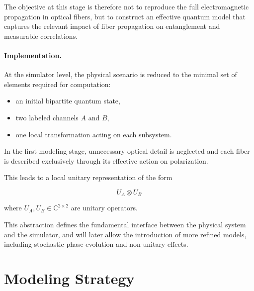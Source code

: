 \documentclass[a4paper]{article}
\begin{document}
The objective at this stage is therefore not to reproduce the full electromagnetic propagation in optical fibers, but to construct an effective quantum model that captures the relevant impact of fiber propagation on entanglement and measurable correlations.

\medskip

\paragraph{Implementation.}

At the simulator level, the physical scenario is reduced to the minimal set of elements required for computation:

\begin{itemize}
\item an initial bipartite quantum state,
\item two labeled channels \( A \) and \( B \),
\item one local transformation acting on each subsystem.
\end{itemize}

\medskip

In the first modeling stage, unnecessary optical detail is neglected and each fiber is described exclusively through its effective action on polarization.

This leads to a local unitary representation of the form

\[
U_A \otimes U_B
\]

where \( U_A, U_B \in \mathbb{C}^{2 \times 2} \) are unitary operators.

\medskip

This abstraction defines the fundamental interface between the physical system and the simulator, and will later allow the introduction of more refined models, including stochastic phase evolution and non-unitary effects.



\section{Modeling Strategy}

\end{document}
